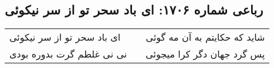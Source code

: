\begin{center}
\section*{رباعی شماره ۱۷۰۶: ای باد سحر تو از سر نیکوئی}
\label{sec:1706}
\begin{longtable}{l p{0.5cm} r}
ای باد سحر تو از سر نیکوئی
&&
شاید که حکایتم به آن مه گوئی
\\
نی نی غلطم گرت بدوره بودی
&&
پس گرد جهان دگر کرا میجوئی
\\
\end{longtable}
\end{center}
